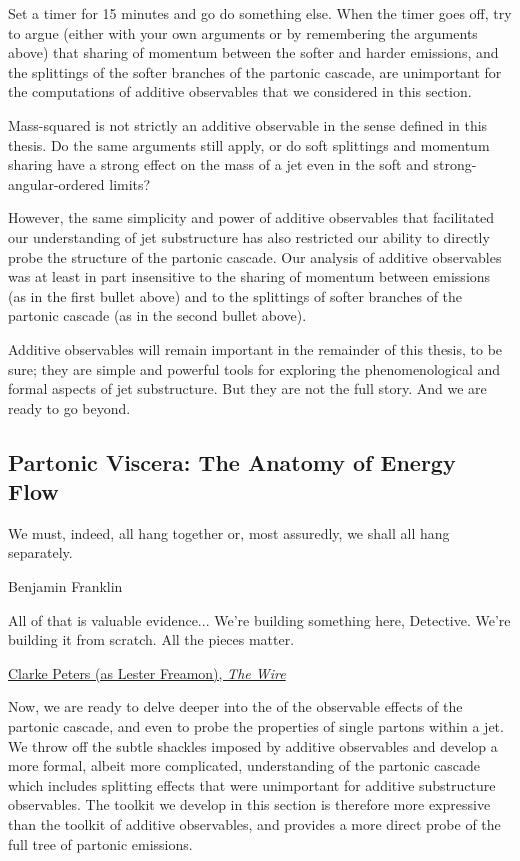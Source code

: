 \begin{exercise}
    Set a timer for 15 minutes and go do something else.
    When the timer goes off, try to argue (either with your own arguments or by remembering the arguments above) that sharing of momentum between the softer and harder emissions, and the splittings of the softer branches of the partonic cascade, are unimportant for the computations of additive observables that we considered in this section.

    Mass-squared is not strictly an additive observable in the sense defined in this thesis.
    Do the same arguments still apply, or do soft splittings and momentum sharing have a strong effect on the mass of a jet even in the soft and strong-angular-ordered limits?
\end{exercise}


However, the same simplicity and power of additive observables that facilitated our understanding of jet substructure has also restricted our ability to directly probe the structure of the partonic cascade.
%
Our analysis of additive observables was at least in part insensitive to the sharing of momentum between emissions (as in the first bullet above) and to the splittings of softer branches of the partonic cascade (as in the second bullet above).


Additive observables will remain important in the remainder of this thesis, to be sure;
%
they are simple and powerful tools for exploring the phenomenological and formal aspects of jet substructure.
%
But they are not the full story.
%
And we are ready to go beyond.




\subsection{Partonic Viscera: The Anatomy of Energy Flow}
\label{sec:p2p-fragmentation}

\epigraph{We must, indeed, all hang together or, most assuredly, we shall all hang separately.}{Benjamin Franklin}

\epigraph{All of that is valuable evidence... We're building something here, Detective. We're building it from scratch. All the pieces matter.}{\href{https://youtu.be/lgRxFFmr538?t=18}{Clarke Peters (as Lester Freamon), \textit{The Wire}}}



Now, we are ready to delve deeper into the of the observable effects of the partonic cascade, and even to probe the properties of single partons within a jet.
%
We throw off the subtle shackles imposed by additive observables and develop a more formal, albeit more complicated, understanding of the partonic cascade which includes splitting effects that were unimportant for additive substructure observables.
%
The toolkit we develop in this section is therefore more expressive than the toolkit of additive observables, and provides a more direct probe of the full tree of partonic emissions.


